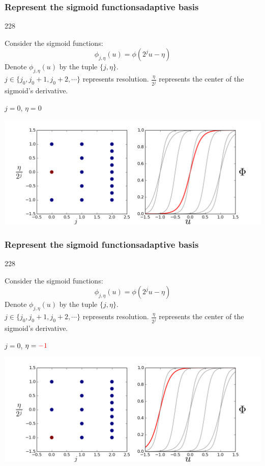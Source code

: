 \documentclass{beamer}
\newcommand{\barrow}{\item[\color{darkred}\ding{228}]}
\begin{document}
\setcounter{framenumber}{15}
\begin{frame}
    \frametitle{Represent the sigmoid functions\hfill \scriptsize{adaptive basis}}\small
    \begin{dinglist}{228}
        \barrow
        Consider the sigmoid functions:
        $$
            \phi_{j, \eta}(u) = \phi(2^j u - \eta)
        $$
        Denote $\phi_{j, \eta}(u)$ by the tuple $\{j, \eta\}$.\\
        \vspace{.2cm}
        $j\in \{j_0, j_0+1, j_0+2, \cdots \}$ represents resolution. $\frac{\eta}{2^j}$ represents
        the center of the sigmoid's derivative.
        \barrow $j=0$, $\eta=0$\\
        \begin{center}
            \includegraphics[width=10.cm]{basis_0.png}
        \end{center}
    \end{dinglist}
\end{frame}


\setcounter{framenumber}{15}
\begin{frame}
    \frametitle{Represent the sigmoid functions\hfill \scriptsize{adaptive basis}}\small
    \begin{dinglist}{228}
        \barrow
        Consider the sigmoid functions:
        $$
            \phi_{j, \eta}(u) = \phi(2^j u - \eta)
        $$
        Denote $\phi_{j, \eta}(u)$ by the tuple $\{j, \eta\}$.\\
        \vspace{.2cm}
        $j\in \{j_0, j_0+1, j_0+2, \cdots \}$ represents resolution. $\frac{\eta}{2^j}$ represents
        the center of the sigmoid's derivative.
        \barrow $j=0$, $\eta=\textcolor{red}{-1}$\\
        \begin{center}
            \includegraphics[width=10.cm]{basis_1.png}
        \end{center}
    \end{dinglist}
\end{frame}
\end{document}
